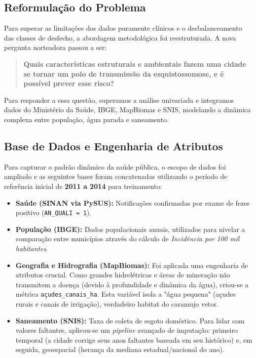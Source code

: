 \documentclass[12pt]{article}
\begin{document}
\subsection{Reformulação do Problema}

Para superar as limitações dos dados puramente clínicos e o desbalanceamento das classes
de desfecho, a abordagem metodológica foi reestruturada. A nova pergunta norteadora
passou a ser:

\begin{quote}
\textbf{Quais características estruturais e ambientais fazem uma cidade se tornar um polo
de transmissão da esquistossomose, e é possível prever esse risco?}
\end{quote}

Para responder a essa questão, superamos a análise univariada e integramos dados do
Ministério da Saúde, IBGE, MapBiomas e SNIS, modelando a dinâmica complexa entre
população, água parada e saneamento.

\subsection{Base de Dados e Engenharia de Atributos}

Para capturar o padrão dinâmico da saúde pública, o escopo de dados foi ampliado e as
seguintes bases foram concatenadas utilizando o período de referência inicial de
\textbf{2011 a 2014} para treinamento:

\begin{itemize}
    \item \textbf{Saúde (SINAN via PySUS):} Notificações confirmadas por exame de fezes
    positivo (\texttt{AN\_QUALI = 1}).
    \item \textbf{População (IBGE):} Dados populacionais anuais, utilizados para nivelar
    a comparação entre municípios através do cálculo de \textit{Incidência por 100 mil
    habitantes}.
    \item \textbf{Geografia e Hidrografia (MapBiomas):} Foi aplicada uma engenharia de
    atributos crucial. Como grandes hidrelétricas e áreas de mineração não transmitem a
    doença (devido à profundidade e dinâmica da água), criou-se a métrica
    \texttt{açudes\_canais\_ha}. Esta variável isola a "água pequena" (açudes rurais e
    canais de irrigação), verdadeiro habitat do caramujo vetor.
    \item \textbf{Saneamento (SNIS):} Taxa de coleta de esgoto doméstico. Para lidar com
    valores faltantes, aplicou-se um \textit{pipeline} avançado de imputação: primeiro
    temporal (a cidade corrige seus anos faltantes baseada em seu histórico) e, em
    seguida, geoespacial (herança da mediana estadual/nacional do ano).
\end{itemize}
\end{document}
